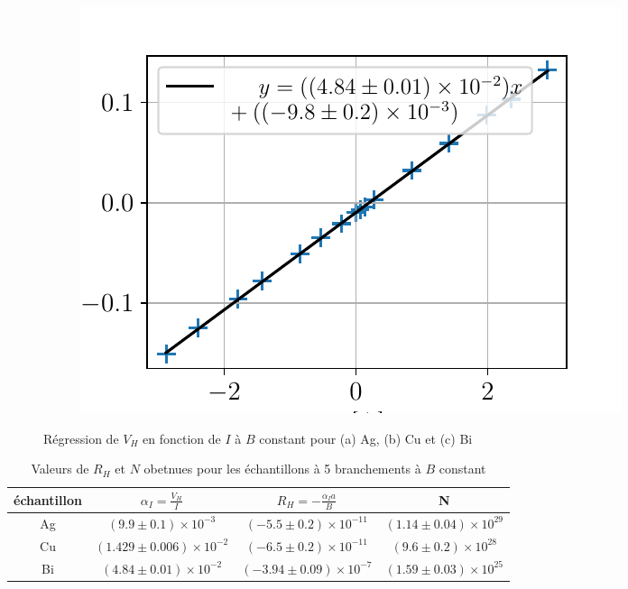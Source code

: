 \begin{figure}{}
\begin{subfigure}{0.3\textwidth}
    \end{subfigure}
    \begin{subfigure}{0.3\textwidth}
        \includegraphics[width=\linewidth]{figures/Bi_I.pdf}
        \caption{}
        \label{fig:Bi_I}
    \end{subfigure}
    \caption{Régression de \(V_H\) en fonction de \(I\) à \(B\) constant pour (a) Ag, (b) Cu et (c) Bi}
    \label{fig:5branch_I}
    \vspace*{1cm}
\end{figure}


\begin{table}[h]
    \centering
    \begin{tabulary}{\textwidth}{C C C C}
        \toprule
        échantillon & \(\alpha_I = \frac{V_H}{I}\) & \(R_H = -\frac{\alpha_I a}{B}\) & N \\
        \midrule
        Ag & \((9.9 \pm 0.1) \times 10^{-3}\) & \((-5.5 \pm 0.2) \times 10^{-11}\) & \((1.14 \pm 0.04) \times 10^{29}\) \\
        Cu & \((1.429 \pm 0.006) \times 10^{-2}\) & \((-6.5 \pm 0.2) \times 10^{-11}\) & \((9.6 \pm 0.2) \times 10^{28}\) \\
        Bi & \((4.84 \pm 0.01) \times 10^{-2}\) & \((-3.94 \pm 0.09) \times 10^{-7}\) & \((1.59 \pm 0.03) \times 10^{25}\) \\
        \bottomrule
    \end{tabulary}
    \caption{Valeurs de \(R_H\) et \(N\) obetnues pour les échantillons à 5 branchements à \(B\) constant}
    \label{tab:5branch_I}
\end{table}


